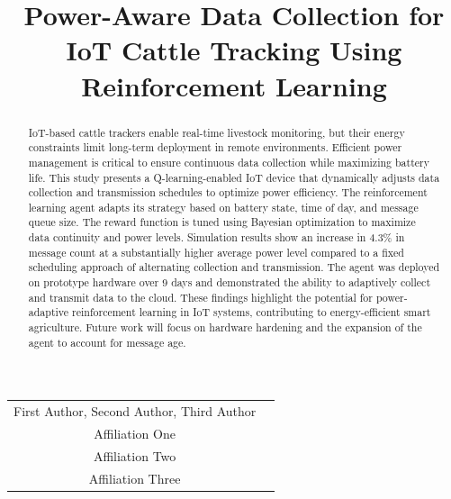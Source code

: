 \documentclass[10pt]{cai}
\begin{document}
\def\conferenceyear{2025}
\begin{center}

\title{Power-Aware Data Collection for IoT Cattle Tracking Using Reinforcement Learning}
\maketitle

\thispagestyle{empty}

\begin{tabular}{cc}
First Author\upstairs{\affilone,*}, Second Author\upstairs{\affilone}, Third Author\upstairs{\affilthree}
\\[0.25ex]
{\small \upstairs{\affilone} Affiliation One} \\
{\small \upstairs{\affiltwo} Affiliation Two} \\
{\small \upstairs{\affilthree} Affiliation Three} \\
\end{tabular}
  
\vspace*{0.2in}
\end{center}

\begin{abstract}
IoT-based cattle trackers enable real-time livestock monitoring, but their energy constraints limit long-term deployment in remote environments.
Efficient power management is critical to ensure continuous data collection while maximizing battery life.
This study presents a Q-learning-enabled IoT device that dynamically adjusts data collection and transmission schedules to optimize power efficiency.
The reinforcement learning agent adapts its strategy based on battery state, time of day, and message queue size.
The reward function is tuned using Bayesian optimization to maximize data continuity and power levels.
Simulation results show an increase in 4.3\% in message count at a substantially higher average power level compared to a fixed scheduling approach of alternating collection and transmission.
The agent was deployed on prototype hardware over 9 days and demonstrated the ability to adaptively collect and transmit data to the cloud. 
These findings highlight the potential for power-adaptive reinforcement learning in IoT systems, contributing to energy-efficient smart agriculture.
Future work will focus on hardware hardening and the expansion of the agent to account for message age.

\end{abstract}
\end{document}
